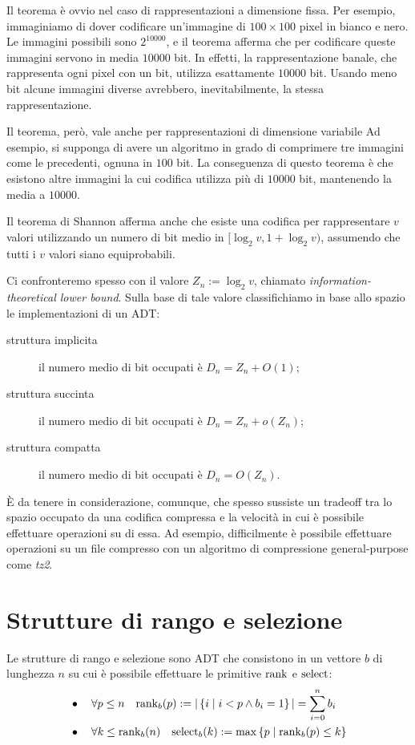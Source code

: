 Il teorema è ovvio nel caso di rappresentazioni a dimensione fissa.
Per esempio, immaginiamo di dover codificare un'immagine di $100\times100$ pixel in bianco e nero.
Le immagini possibili sono $2^{10000}$, e il teorema afferma che per codificare queste immagini servono in media $10000$ bit.
In effetti, la rappresentazione banale, che rappresenta ogni pixel con un bit, utilizza esattamente $10000$ bit.
Usando meno bit alcune immagini diverse avrebbero, inevitabilmente, la stessa rappresentazione.

Il teorema, però, vale anche per rappresentazioni di dimensione variabile
Ad esempio, si supponga di avere un algoritmo in grado di comprimere tre immagini come le precedenti, ognuna in $100$ bit.
La conseguenza di questo teorema è che esistono altre immagini la cui codifica utilizza più di $10000$ bit, mantenendo la media a $10000$.

Il teorema di Shannon afferma anche che esiste una codifica per rappresentare $v$ valori utilizzando un numero di bit medio in $[\log_2 v,1+\log_2 v)$, assumendo che tutti i $v$ valori siano equiprobabili.

Ci confronteremo spesso con il valore $Z_n:=\log_2 v$, chiamato \emph{information-theoretical lower bound}.
Sulla base di tale valore classifichiamo in base allo spazio le implementazioni di un ADT:
\begin{description}
	\item[struttura implicita] il numero medio di bit occupati è $D_n=Z_n+O(1)$;
	\item[struttura succinta] il numero medio di bit occupati è $D_n=Z_n+o(Z_n)$;
	\item[struttura compatta] il numero medio di bit occupati è $D_n=O(Z_n)$.
\end{description}

È da tenere in considerazione, comunque, che spesso sussiste un tradeoff tra lo spazio occupato da una codifica compressa e la velocità in cui è possibile effettuare operazioni su di essa.
Ad esempio, difficilmente è possibile effettuare operazioni su un file compresso con un algoritmo di compressione general-purpose come \textit{tz2}.



\section{Strutture di rango e selezione}
Le strutture di rango e selezione sono ADT che consistono in un vettore $b$ di lunghezza $n$ su cui è possibile effettuare le primitive $\mathrm{rank}$ e $\mathrm{select}$:
\begin{align*}
	 & \bullet\quad \forall p\leq n\quad \mathrm{rank}_b(p) := | \left\{ i\mid i<p\land b_i=1 \right\} | = \sum_{i=0}^n b_i \\
	 & \bullet\quad \forall k\leq \mathrm{rank}_b(n)\quad \mathrm{select}_b(k) := \max\left\{ p\mid \mathrm{rank}_b(p)\leq k \right\}
\end{align*}

